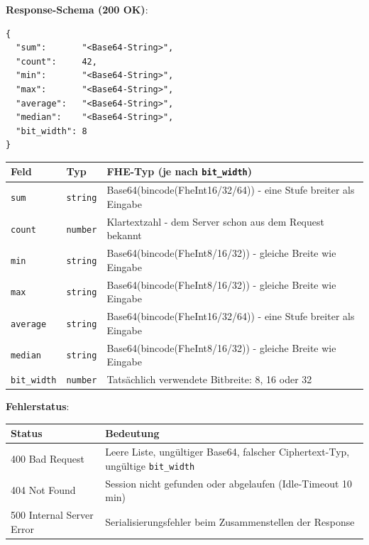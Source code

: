 \textbf{Response-Schema (200 OK)}:
\begin{lstlisting}
{
  "sum":       "<Base64-String>",
  "count":     42,
  "min":       "<Base64-String>",
  "max":       "<Base64-String>",
  "average":   "<Base64-String>",
  "median":    "<Base64-String>",
  "bit_width": 8
}
\end{lstlisting}

\begin{tabular}{||l|l|p{9cm}||}
    \hline
    \textbf{Feld} & \textbf{Typ} & \textbf{FHE-Typ (je nach} \verb|bit_width|\textbf{)} \\
    \hline\hline
    \verb|sum| & \verb|string| & Base64(bincode(FheInt16/32/64)) - eine Stufe breiter als Eingabe \\
    \hline
    \verb|count| & \verb|number| & Klartextzahl - dem Server schon aus dem Request bekannt \\
    \hline
    \verb|min| & \verb|string| & Base64(bincode(FheInt8/16/32)) - gleiche Breite wie Eingabe \\
    \hline
    \verb|max| & \verb|string| & Base64(bincode(FheInt8/16/32)) - gleiche Breite wie Eingabe \\
    \hline
    \verb|average| & \verb|string| & Base64(bincode(FheInt16/32/64)) - eine Stufe breiter als Eingabe \\
    \hline
    \verb|median| & \verb|string| & Base64(bincode(FheInt8/16/32)) - gleiche Breite wie Eingabe \\
    \hline
    \verb|bit_width| & \verb|number| & Tatsächlich verwendete Bitbreite: 8, 16 oder 32 \\
    \hline
\end{tabular}

\textbf{Fehlerstatus}:\par
\begin{tabular}{||l|p{9cm}||}
    \hline
    \textbf{Status} & \textbf{Bedeutung} \\
    \hline\hline
    400 Bad Request & Leere Liste, ungültiger Base64, falscher Ciphertext-Typ, ungültige \verb|bit_width| \\
    \hline
    404 Not Found & Session nicht gefunden oder abgelaufen (Idle-Timeout 10 min) \\
    \hline
    500 Internal Server Error & Serialisierungsfehler beim Zusammenstellen der Response \\
    \hline
\end{tabular}

